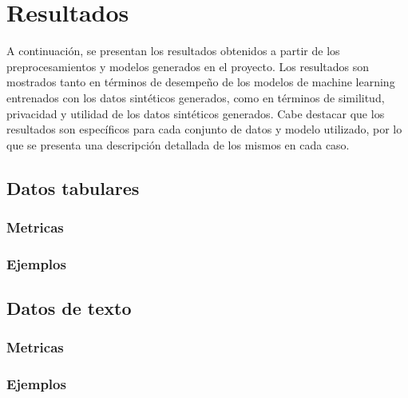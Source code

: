 \chapter{Resultados}
A continuación, se presentan los resultados obtenidos a partir de los preprocesamientos y modelos generados en el proyecto. Los resultados son mostrados tanto en términos de desempeño de los modelos de machine learning entrenados con los datos sintéticos generados, como en términos de similitud, privacidad y utilidad de los datos sintéticos generados. Cabe destacar que los resultados son específicos para cada conjunto de datos y modelo utilizado, por lo que se presenta una descripción detallada de los mismos en cada caso.

\section{Datos tabulares}
\subsection{Metricas}
\subsection{Ejemplos}
\section{Datos de texto}
\subsection{Metricas}
\subsection{Ejemplos}
